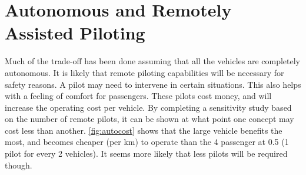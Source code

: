 \section{Autonomous and Remotely Assisted Piloting}

Much of the trade-off has been done assuming that all the vehicles are completely autonomous. It is likely that remote piloting capabilities will be necessary for safety reasons. A pilot may need to intervene in certain situations. This also helps with a feeling of comfort for passengers. These pilots cost money, and will increase the operating cost per vehicle. By completing a sensitivity study based on the number of remote pilots, it can be shown at what point one concept may cost less than another. \autoref{fig:autocost} shows that the large vehicle benefits the most, and becomes cheaper (per km) to operate than the 4 passenger at 0.5 (1 pilot for every 2 vehicles). It seems more likely that less pilots will be required though.
